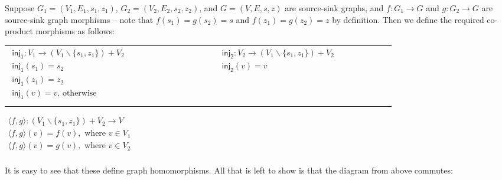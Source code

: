 Suppose $G_1 = (V_1 , E_1, s_1, z_1)$, $G_2 = (V_2 , E_2, s_2, z_2)$,
and $G = (V , E, s, z)$ are source-sink graphs, and $f : G_1 \to G$
and $g : G_2 \to G$ are source-sink graph morphisms -- note that
$f(s_1) = g(s_2) = s$ and $f(z_1) = g(z_2) = z$ by definition.  Then
we define the required co-product morphisms as follows:
\begin{center}
  \begin{tabular}{llllllllllllllllll}
    \begin{math}
    \begin{array}{lll}
      \mathsf{inj_1} : V_1 \to (V_1 \mathop{\backslash} \{s_1,z_1\}) + V_2\\
      \mathsf{inj_1}(s_1) = s_2\\
      \mathsf{inj_1}(z_1) = z_2\\
      \mathsf{inj_1}(v) = v \text{, otherwise}\\
    \end{array}
    \end{math}
    & \quad & \quad & \quad & \quad &\quad &\quad &\quad &\quad &\quad &\quad &
    \begin{math}
    \begin{array}{lll}
      \mathsf{inj_2} : V_2 \to (V_1 \mathop{\backslash} \{s_1,z_1\}) + V_2\\
      \mathsf{inj_2}(v) = v\\
      \\
      \\
    \end{array}
  \end{math}
  \end{tabular}

  \vspace{10px}
  \begin{math}
    \begin{array}{lll}
      \langle f , g \rangle : (V_1 \mathop{\backslash} \{s_1,z_1\}) + V_2 \to V\\      
      \langle f , g \rangle(v) = f(v), \text{ where } v \in V_1\\
      \langle f , g \rangle(v) = g(v), \text{ where } v \in V_2\\
    \end{array}
  \end{math}
\end{center}
It is easy to see that these define graph homomorphisms.  All that is
left to show is that the diagram from above commutes:
